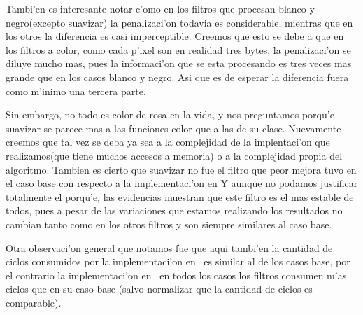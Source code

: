 Tambi'en es interesante notar c'omo en los filtros que procesan blanco y negro(excepto suavizar) la penalizaci'on todavia es considerable, mientras que en los otros la diferencia es casi imperceptible. Creemos que esto se debe a que en los filtros a color, como cada p'ixel son en realidad tres bytes, la penalizaci'on se diluye mucho mas, pues la informaci'on que se esta procesando es tres veces mas grande que en los casos blanco y negro. Asi que es de esperar la diferencia fuera como m'inimo una tercera parte. 

Sin embargo, no todo es color de rosa en la vida, y nos preguntamos porqu'e suavizar se parece mas a las funciones color que a las de su clase. Nuevamente creemos que tal vez se deba ya sea a la complejidad de la implentaci'on que realizamos(que tiene muchos accesos a memoria) o a la complejidad propia del algoritmo. Tambien es cierto que suavizar no fue el filtro que peor mejora tuvo en el caso base con respecto a la implementaci'on en \C\. Y aunque no podamos justificar totalmente el porqu'e, las evidencias muestran que este filtro es el mas estable de todos, pues a pesar de las variaciones que estamos realizando los resultados no cambian tanto como en los otros filtros y son siempre similares al caso base.

Otra observaci'on general que notamos fue que aqui tambi'en la cantidad de ciclos consumidos por la implementaci'on en \C \ es
similar al de los casos base, por el contrario la implementaci'on en \ass \ en todos los casos los filtros consumen m'as ciclos que en su caso base (salvo normalizar que la cantidad de ciclos es comparable).

